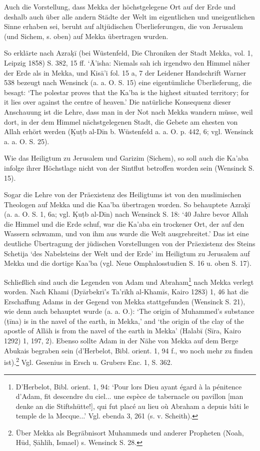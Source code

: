 \documentclass[a4paper, 11pt, oneside]{article}
\begin{document}
Auch die Vorstellung, dass Mekka der höchstgelegene Ort auf der Erde und deshalb auch über alle andern Städte der Welt im eigentlichen und uneigentlichen Sinne erhaben sei, beruht auf altjüdischen Überlieferungen, die von Jerusalem (und Sichem, s. oben) auf Mekka übertragen wurden.

So erklärte nach Azra\d{k}ī (bei Wüstenfeld, Die Chroniken der Stadt Mekka, vol. 1, Leipzig 1858) S. 382, 15 ff. `Ā'isha: Niemals sah ich irgendwo den Himmel näher der Erde als in Mekka, und Kisā'i fol. 15 a, 7 der Leidener Handschrift Warner 538 bezeugt nach Wensinck (a. a. O. S. 15) eine eigentümliche Überlieferung, die besagt: `The polestar proves that the Ka'ba is the highest situated territory; for it lies over against the centre of heaven.' Die natürliche Konsequenz dieser Anschauung ist die Lehre, dass man in der Not nach Mekka wandern müsse, weil dort, in der dem Himmel nächstgelegenen Stadt, die Gebete am ehesten von Allah erhört werden (\d{K}uṭb al-Dīn b. Wüstenfeld a. a. O. p. 442, 6; vgl. Wensinck a. a. O. S. 25).

Wie das Heiligtum zu Jerusalem und Garizim (Sichem), so soll auch die Ka'aba infolge ihrer Höchstlage nicht von der Sintflut betroffen worden sein (Wensinck S. 15).

Sogar die Lehre von der Präexistenz des Heiligtums ist von den muslimischen Theologen auf Mekka und die Kaa'ba übertragen worden. So behauptete Azra\d{k}ī (a. a. O. S. 1, 6a; vgl. \d{K}uṭb al-Dīn) nach Wensinck S. 18: `40 Jahre bevor Allah die Himmel und die Erde schuf, war die Ka'aba ein trockener Ort, der auf den Wassern schwamm, und von ihm aus wurde die Welt ausgrebreitet.' Das ist eine deutliche Übertragung der jüdischen Vorstellungen von der Präexistenz des Steins Schetija `des Nabelsteins der Welt und der Erde' im Heiligtum zu Jerusalem auf Mekka und die dortige Kaa'ba (vgl. Neue Omphalosstudien S. 16 u. oben S. 17).

Schließlich sind auch die Legenden von Adam und Abraham\footnote{D'Herbelot, Bibl. orient. 1, 94: `Pour lors Dieu ayant égard à la pénitence d'Adam, fit descendre du ciel... une espèce de tabernacle ou pavillon [man denke an die Stiftshütte!], qui fut placé au lieu où Abraham a depuis bâti le temple de la Mecque...' Vgl. ebenda 3, 261 (s. v. Scheith).} nach Mekka verlegt worden. Nach Khami (Dyārbekrī's Ta'rīkh al-Khamīs, Kairo 1283) 1, 46 hat die Erschaffung Adams in der Gegend von Mekka stattgefunden (Wensinck S. 21), wie denn auch behauptet wurde (a. a. O.): `The origin of Muhammed's substance (ṭīna) is in the navel of the earth, in Mekka,' and `the origin of the clay of the apostle of Allāh is from the navel of the earth in Mekka' (Halabī (Sīra, Kairo 1292) 1, 197, 2). Ebenso sollte Adam in der Nähe von Mekka auf dem Berge Abukais begraben sein (d'Herbelot, Bibl. orient. 1, 94 f., wo noch mehr zu finden ist).\footnote{Über Mekka als Begräbnisort Muhammeds und anderer Propheten (Noah, Hūd, \d{S}āhlih, Ismael) s. Wensinck S. 28.} Vgl. Gesenius in Ersch u. Grubers Enc. 1, S. 362.
\end{document}
